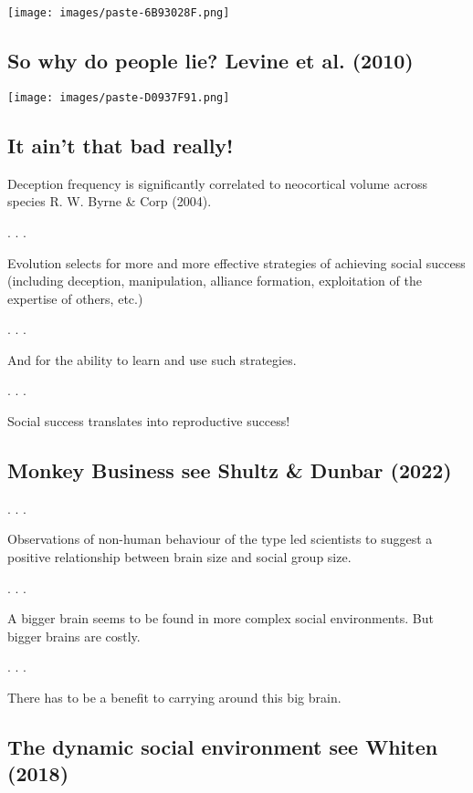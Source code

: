 \documentclass[
  letterpaper,
  DIV=11,
  numbers=noendperiod]{scrartcl}
\begin{document}
\texttt{[image: images/paste-6B93028F.png]}

\hypertarget{so-why-do-people-lie-levine2010d}{%
\subsection{So why do people lie? Levine et al.
(2010)}\label{so-why-do-people-lie-levine2010d}}

\texttt{[image: images/paste-D0937F91.png]}

\hypertarget{it-aint-that-bad-really}{%
\subsection{It ain't that bad really!}\label{it-aint-that-bad-really}}

Deception frequency is significantly correlated to neocortical volume
across species R. W. Byrne \& Corp (2004).

. . .

Evolution selects for more and more effective strategies of achieving
social success (including deception, manipulation, alliance formation,
exploitation of the expertise of others, etc.)

. . .

And for the ability to learn and use such strategies.

. . .

Social success translates into reproductive success!

\hypertarget{monkey-business-see-shultz2022}{%
\subsection{Monkey Business see Shultz \& Dunbar
(2022)}\label{monkey-business-see-shultz2022}}

. . .

\hfill\break
Observations of non-human behaviour of the type led scientists to
suggest a positive relationship between brain size and social group
size.

. . .

\hfill\break
A bigger brain seems to be found in more complex social environments.
But bigger brains are costly.

. . .

\hfill\break
There has to be a benefit to carrying around this big brain.

\hypertarget{the-dynamic-social-environment-see-whiten2018}{%
\subsection{The dynamic social environment see Whiten
(2018)}\label{the-dynamic-social-environment-see-whiten2018}}
\end{document}
